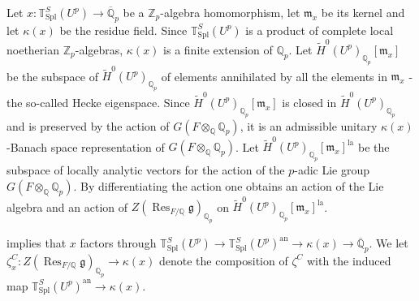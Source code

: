 \documentclass{amsart}
\theoremstyle{definition}
\theoremstyle{remark}
\DeclareMathOperator{\Res}{Res}
\newcommand{\Qp}{\mathbb {Q}_p}
\newcommand{\Zp}{\ZZ_p}
\newcommand{\Qpbar}{\overline{\mathbb{Q}}_p}
\newcommand{\ZZ}{\mathbb Z}
\newcommand{\QQ}{\mathbb Q}
\newcommand{\mm}{\mathfrak m}
\newcommand{\ana}{\mathrm{an}}
\newcommand{\Htilde}{\widetilde{H}^0}
\newcommand{\la}{\mathrm{la}}
\begin{document}
Let $x: \mathbb T^S_{\mathrm{Spl}}(U^p)\rightarrow \Qpbar$ be a $\Zp$-algebra homomorphism, let $\mm_x$ be its kernel and let $\kappa(x)$ be the residue field. 
Since $\mathbb T^S_{\mathrm{Spl}}(U^p)$ is a product of 
complete local noetherian $\Zp$-algebras, $\kappa(x)$ is a finite extension of $\Qp$. 
Let $\Htilde(U^p)_{\Qp}[\mm_x]$ be the subspace of 
$\Htilde(U^p)_{\Qp}$ of elements annihilated by all the 
elements in $\mm_x$ - the so-called Hecke eigenspace. 
Since  $\Htilde(U^p)_{\Qp}[\mm_x]$ is closed in $\Htilde(U^p)_{\Qp}$ and is preserved by the action 
of $G(F\otimes_{\QQ} \Qp)$, it is an admissible unitary
$\kappa(x)$-Banach space representation of  $G(F\otimes_{\QQ} \Qp)$. Let $\Htilde(U^p)_{\Qp}[\mm_x]^{\la}$ be the subspace of locally analytic vectors for the action of the $p$-adic 
Lie group $G(F\otimes_{\QQ} \Qp)$. By differentiating 
the action one obtains an action of the Lie algebra and
an action of $Z(\Res_{F/\QQ} \mathfrak g)_{\Qp}$ on 
$\Htilde(U^p)_{\Qp}[\mm_x]^{\la}$.

 implies that 
$x$ factors through 
$\mathbb T^S_{\mathrm{Spl}}(U^p)\rightarrow 
\mathbb T^S_{\mathrm{Spl}}(U^p)^{\ana}
\rightarrow \kappa(x)\rightarrow \Qpbar$.
We let $\zeta^C_x: Z(\Res_{F/\QQ} \mathfrak g)_{\Qp}\rightarrow \kappa(x)$
denote the composition of $\zeta^C$ with the induced map $\mathbb T^S_{\mathrm{Spl}}(U^p)^{\ana}
\rightarrow \kappa(x)$.
\end{document}
